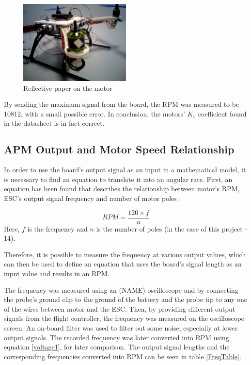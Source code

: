 \begin{figure}[H]
  \centering
    \includegraphics[width=0.5\textwidth]{images/tachometer.jpg}
	\caption{Reflective paper on the motor}
	\label{tachometer}
\end{figure}

By sending the maximum signal from the board, the RPM was measured to be 10812, with a small possible error.
In conclusion, the motors' $K_v$ coefficient found in the datasheet is in fact correct.

\subsection{APM Output and Motor Speed Relationship}

In order to use the board's output signal as an input in a mathematical model, it is necessary to find an equation to translate it into an angular rate.
First, an equation has been found that describes the relationship between motor's RPM, ESC's output signal frequency and number of motor poles \cite{RPMEq}:

\begin{equation}
\label{voltage1}
	RPM = \frac{120\times f}{n}
\end{equation}
Here, $f$ is the frequency and $n$ is the number of poles (in the case of this project - 14).

Therefore, it is possible to measure the frequency at various output values, which can then be used to define an equation that uses the board's signal length as an input value and results in an RPM.

The frequency was measured using an (NAME) oscilloscope and by connecting the probe's ground clip to the ground of the battery and the probe tip to any one of the wires between motor and the ESC. Then, by providing different output signals from the flight controller, the frequency was measured on the oscilloscope screen. An on-board filter was used to filter out some noise, especially at lower output signals. The recorded frequency was later converted into RPM using equation \ref{voltage1}, for later comparison. The output signal lengths and the corresponding frequencies converted into RPM can be seen in table \ref{FreqTable}.

